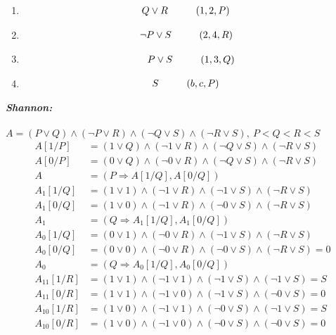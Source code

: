 \documentclass[a4paper,12pt]{article}
\newcommand\tab[1][1cm]{\hspace*{#1}}
\begin{document}
\begin{enumerate}
\begin{multicols}{2}
		\begin{enumerate}
			\item \begin{align*}
				Q\lor R\tab &(1,2,P)
			\end{align*}
			\item \begin{align*}
				\neg P\lor S\tab & (2,4,R) 
			\end{align*}
			\item \begin{align*}
				P\lor S\tab (1,3,Q)
			\end{align*}
			\item \begin{align*}
				S\tab & (b,c,P)
			\end{align*}
		\end{enumerate}
	\end{multicols}
	\emph{\textbf{Shannon:}}\\\\
	$A=(P\lor Q)\land(\neg P\lor R)\land(\neg Q\lor S)\land (\neg R\lor S),\>P<Q<R<S$
	\begin{align*}
		A[1/P]&=(1\lor Q)\land(\neg 1\lor R)\land(\neg Q\lor S)\land (\neg R\lor S)\\
		A[0/P]&=(0\lor Q)\land(\neg 0\lor R)\land(\neg Q\lor S)\land (\neg R\lor S)\\
		A&=(P\Rightarrow A[1/Q],A[0/Q])\\
		A_1[1/Q]&=(1\lor 1)\land(\neg 1\lor R)\land(\neg 1\lor S)\land (\neg R\lor S)\\
		A_1[0/Q]&=(1\lor 0)\land(\neg 1\lor R)\land(\neg 0\lor S)\land (\neg R\lor S)\\
		A_1&=(Q\Rightarrow A_1[1/Q],A_1[0/Q])\\
		A_0[1/Q]&=(0\lor 1)\land(\neg 0\lor R)\land(\neg 1\lor S)\land (\neg R\lor S)\\
		A_0[0/Q]&=(0\lor 0)\land(\neg 0\lor R)\land(\neg 0\lor S)\land (\neg R\lor S)=0\\
		A_0&=(Q\Rightarrow A_0[1/Q],A_0[0/Q])\\
		A_{11}[1/R]&=(1\lor 1)\land(\neg 1\lor 1)\land(\neg 1\lor S)\land (\neg 1\lor S)=S\\
		A_{11}[0/R]&=(1\lor 1)\land(\neg 1\lor 0)\land(\neg 1\lor S)\land (\neg 0\lor S)=0\\
		A_{10}[1/R]&=(1\lor 0)\land(\neg 1\lor 1)\land(\neg 0\lor S)\land (\neg 1\lor S)=S\\
		A_{10}[0/R]&=(1\lor 0)\land(\neg 1\lor 0)\land(\neg 0\lor S)\land (\neg 0\lor S)=0\\

\end{align*}
\end{enumerate}
\end{document}
